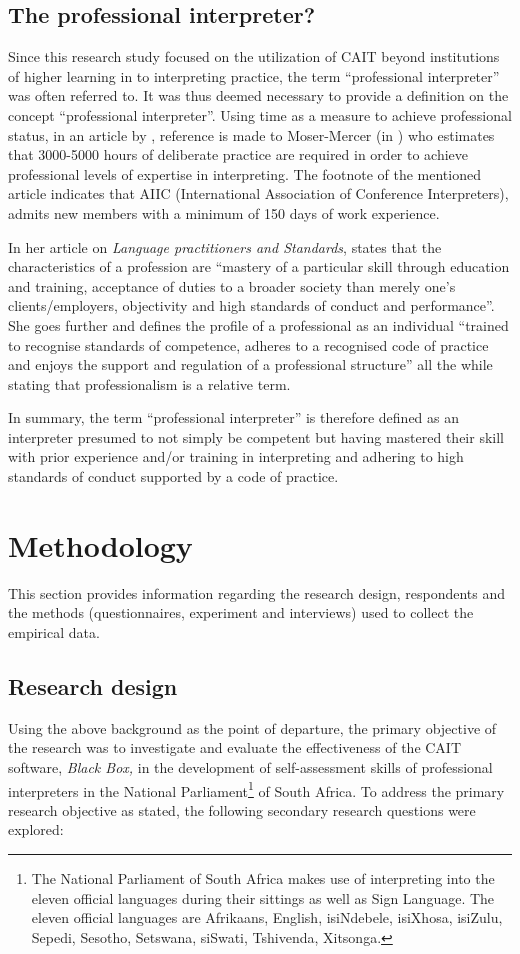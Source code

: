 \documentclass[output=paper]{langsci/langscibook}
\begin{document}
\subsection{The professional interpreter?}
Since this research study focused on the utilization of CAIT beyond institutions of higher learning in to interpreting practice, the term “professional interpreter” was often referred to. It was thus deemed necessary to provide a definition on the concept “professional interpreter”. Using time as a measure to achieve professional status, in an article by \citet[115]{Sandrelli2015}, reference is made to Moser-Mercer (in \citealt{Motta2006}) who estimates that 3000-5000 hours of deliberate practice are required in order to achieve professional levels of expertise in interpreting. The footnote of the mentioned article indicates that AIIC (International Association of Conference Interpreters), admits new members with a minimum of 150 days of work experience.

In her article on \textit{Language practitioners and Standards}, \citet[162]{Feinauer2005} states that the characteristics of a profession are “mastery of a particular skill through education and training, acceptance of duties to a broader society than merely one’s clients/employers, objectivity and high standards of conduct and performance”. She goes further and defines the profile of a professional as an individual “trained to recognise standards of competence, adheres to a recognised code of practice and enjoys the support and regulation of a professional structure” all the while stating that professionalism is a relative term. 

In summary, the term “professional interpreter” is therefore defined as an interpreter presumed to not simply be competent but having mastered their skill with prior experience and/or training in interpreting and adhering to high standards of conduct supported by a code of practice. 

\section{Methodology}
This section provides information regarding the research design, respondents and the methods (questionnaires, experiment and interviews) used to collect the empirical data. 

\subsection{Research design} 
Using the above background as the point of departure, the primary objective of the research was to investigate and evaluate the effectiveness of the CAIT software, \textit{Black Box,} in the development of self-assessment skills of professional interpreters in the National Parliament\footnote{The National Parliament of South Africa makes use of interpreting into the eleven official languages during their sittings as well as Sign Language. The eleven official languages are Afrikaans, English, isiNdebele, isiXhosa, isiZulu, Sepedi, Sesotho, Setswana, siSwati, Tshivenda, Xitsonga.}  of South Africa. To address the primary research objective as stated, the following secondary research questions were explored:
\end{document}
